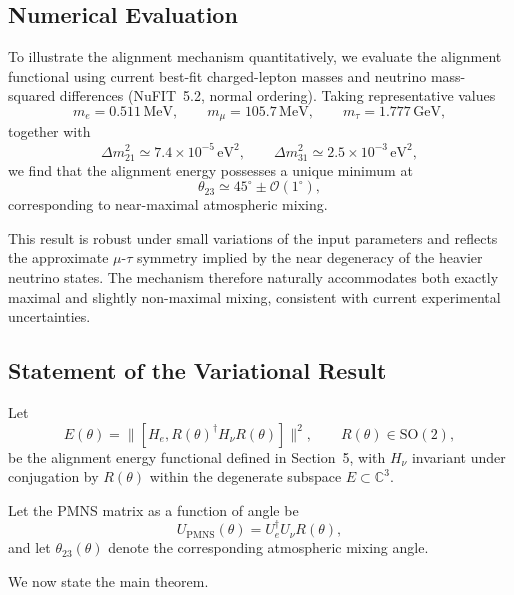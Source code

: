 \subsection{Numerical Evaluation}

To illustrate the alignment mechanism quantitatively, we evaluate the alignment functional using current best-fit charged-lepton masses and neutrino mass-squared differences (NuFIT~5.2, normal ordering). Taking representative values
\[
m_e = 0.511\,\mathrm{MeV}, \qquad
m_\mu = 105.7\,\mathrm{MeV}, \qquad
m_\tau = 1.777\,\mathrm{GeV},
\]
together with
\[
\Delta m_{21}^2 \simeq 7.4\times 10^{-5}\,\mathrm{eV}^2,
\qquad
\Delta m_{31}^2 \simeq 2.5\times 10^{-3}\,\mathrm{eV}^2,
\]
we find that the alignment energy possesses a unique minimum at
\[
\theta_{23} \simeq 45^\circ \pm \mathcal{O}(1^\circ),
\]
corresponding to near-maximal atmospheric mixing.

This result is robust under small variations of the input parameters and reflects the approximate $\mu$-$\tau$ symmetry implied by the near degeneracy of the heavier neutrino states. The mechanism therefore naturally accommodates both exactly maximal and slightly non-maximal mixing, consistent with current experimental uncertainties.

\subsection{Statement of the Variational Result}

Let
\[
E(\theta)=\big\| [H_e, R(\theta)^\dagger H_\nu R(\theta)] \big\|^2,
\qquad R(\theta)\in\mathrm{SO}(2),
\]
be the alignment energy functional defined in Section~5, with $H_\nu$ invariant under conjugation by $R(\theta)$ within the degenerate subspace $E\subset\mathbb C^3$.

Let the PMNS matrix as a function of angle be
\[
U_{\mathrm{PMNS}}(\theta)=U_e^\dagger U_\nu R(\theta),
\]
and let $\theta_{23}(\theta)$ denote the corresponding atmospheric mixing angle.

We now state the main theorem.


